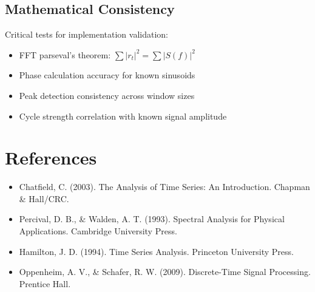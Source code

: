 \documentclass{article}
\begin{document}
\subsection{Mathematical Consistency}

Critical tests for implementation validation:
\begin{itemize}
\item FFT parseval's theorem: $\sum |r_t|^2 = \sum |S(f)|^2$
\item Phase calculation accuracy for known sinusoids
\item Peak detection consistency across window sizes
\item Cycle strength correlation with known signal amplitude
\end{itemize}

\section{References}

\begin{itemize}
\item Chatfield, C. (2003). The Analysis of Time Series: An Introduction. Chapman \& Hall/CRC.
\item Percival, D. B., \& Walden, A. T. (1993). Spectral Analysis for Physical Applications. Cambridge University Press.
\item Hamilton, J. D. (1994). Time Series Analysis. Princeton University Press.
\item Oppenheim, A. V., \& Schafer, R. W. (2009). Discrete-Time Signal Processing. Prentice Hall.
\end{itemize}
\end{document}
